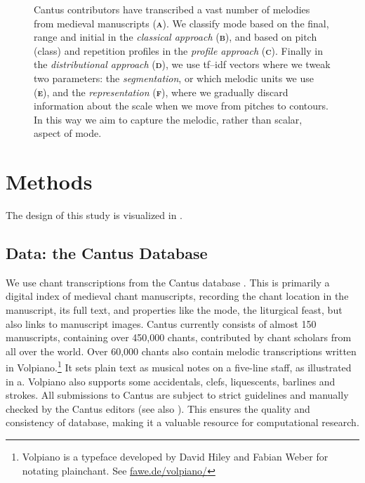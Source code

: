 \documentclass{article}
\newcommand{\subfiglabel}[1]{(\textbf{\textsc{#1}})}
\begin{document}
\begin{figure}
{        Cantus contributors have transcribed a vast number of melodies from medieval manuscripts \subfiglabel{a}.
        We classify mode based on the final, range and initial in the \emph{classical approach} \subfiglabel{b}, and based on pitch (class) and repetition profiles in the \emph{profile approach} \subfiglabel{c}.
        Finally in the \emph{distributional approach} \subfiglabel{d}, we use tf--idf vectors where we tweak two parameters: the \emph{segmentation}, or which melodic units we use \subfiglabel{e}, and the \emph{representation} \subfiglabel{f}, where we gradually discard information about the scale when we move from pitches to contours.
        In this way we aim to capture the melodic, rather than scalar, aspect of mode.
        \label{fig:overview}
    }
\end{figure}



\section{Methods}



The design of this study is visualized in .


\subsection{Data: the Cantus Database}

We use chant transcriptions from the Cantus database \cite{Cantus}.
This is primarily a digital index of medieval chant manuscripts, recording the chant location in the manuscript, its full text, and properties like the mode, the liturgical feast, but also links to manuscript images.
Cantus currently consists of almost 150 manuscripts, containing over 450,000 chants, contributed by chant scholars from all over the world.
Over 60,000 chants also contain melodic transcriptions written in Volpiano.\footnote{
    Volpiano is a typeface developed by David Hiley and Fabian Weber for notating plainchant. See \url{fawe.de/volpiano/}
    }
It sets plain text as musical notes on a five-line staff, as illustrated in a.
Volpiano also supports some accidentals, clefs, liquescents, barlines and strokes.
All submissions to Cantus are subject to strict guidelines and manually checked by the Cantus editors (see also \cite{Helsen2011}).
This ensures the quality and consistency of database, making it a valuable resource for computational research. 
\end{document}
